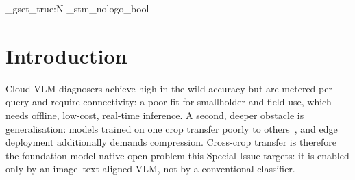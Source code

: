 \documentclass[a4paper,fleqn]{cas-dc}
\begin{document}
\ExplSyntaxOn
\bool_gset_true:N \g_stm_nologo_bool
\ExplSyntaxOff
\maketitle

\section{Introduction}

Cloud VLM diagnosers achieve high in-the-wild accuracy but are metered per query and
require connectivity: a poor fit for smallholder and field use, which needs offline, low-cost,
real-time inference. A second, deeper obstacle is generalisation: models trained on one crop transfer
poorly to others~\citep{bouacida2025}, and edge deployment additionally demands compression. Cross-crop
transfer is
therefore the foundation-model-native open problem this Special Issue targets: it is enabled only by an
image--text-aligned VLM, not by a conventional classifier.
\end{document}
